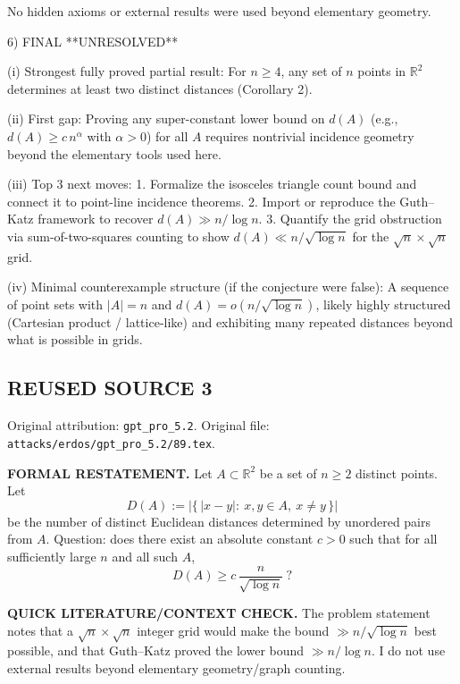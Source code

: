 No hidden axioms or external results were used beyond elementary geometry.

6) FINAL
**UNRESOLVED**

(i) Strongest fully proved partial result:
For $n\ge 4$, any set of $n$ points in $\mathbb{R}^2$ determines at least
two distinct distances (Corollary 2).

(ii) First gap:
Proving any super-constant lower bound on $d(A)$ (e.g., $d(A)\ge c\, n^\alpha$
with $\alpha>0$) for all $A$ requires nontrivial incidence geometry beyond the
elementary tools used here.

(iii) Top 3 next moves:
1. Formalize the isosceles triangle count bound and connect it to
   point-line incidence theorems.
2. Import or reproduce the Guth--Katz framework to recover $d(A)\gg n/\log n$.
3. Quantify the grid obstruction via sum-of-two-squares counting to show
   $d(A)\ll n/\sqrt{\log n}$ for the $\sqrt{n}\times\sqrt{n}$ grid.

(iv) Minimal counterexample structure (if the conjecture were false):
A sequence of point sets with $|A|=n$ and $d(A)=o(n/\sqrt{\log n})$, likely
highly structured (Cartesian product / lattice-like) and exhibiting many
repeated distances beyond what is possible in grids.


\subsection*{REUSED SOURCE 3}
Original attribution: \texttt{gpt\_pro\_5.2}.
Original file: \texttt{attacks/erdos/gpt\_pro\_5.2/89.tex}.


\noindent\textbf{FORMAL RESTATEMENT.}
Let $A\subset\mathbb{R}^2$ be a set of $n\ge 2$ distinct points. Let
\[
D(A):=\bigl|\{\,|x-y|:\ x,y\in A,\ x\ne y\,\}\bigr|
\]
be the number of distinct Euclidean distances determined by unordered pairs from $A$.
Question: does there exist an absolute constant $c>0$ such that for all sufficiently large $n$ and all such $A$,
\[
D(A)\ge c\,\frac{n}{\sqrt{\log n}}\ ?
\]

\medskip
\noindent\textbf{QUICK LITERATURE/CONTEXT CHECK.}
The problem statement notes that a $\sqrt n\times \sqrt n$ integer grid would make the bound $\gg n/\sqrt{\log n}$ best possible, and that Guth--Katz proved the lower bound $\gg n/\log n$. I do not use external results beyond elementary geometry/graph counting.

